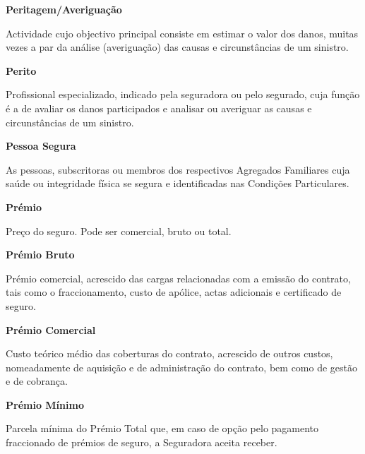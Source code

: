 \begin{description}
\item \textbf{Peritagem/Averiguação}

Actividade cujo objectivo principal consiste em estimar o valor dos danos, muitas vezes a par da análise (averiguação) das causas e circunstâncias de um sinistro.
\end{description}

\begin{description}
\item \textbf{Perito}

Profissional especializado, indicado pela seguradora ou pelo segurado, cuja função é a de avaliar os danos participados e analisar ou averiguar as causas e circunstâncias de um sinistro.
\end{description}

\begin{description}
\item \textbf{Pessoa Segura}

As pessoas, subscritoras ou membros dos respectivos Agregados Familiares cuja saúde ou integridade física se segura e identificadas nas Condições Particulares.
\end{description}

\begin{description}
\item \textbf{Prémio}

Preço do seguro. Pode ser comercial, bruto ou total.
\end{description}

\begin{description}
\item \textbf{Prémio Bruto}

Prémio comercial, acrescido das cargas relacionadas com a emissão do contrato, tais como o fraccionamento, custo de apólice, actas adicionais e certificado de seguro.
\end{description}

\begin{description}
\item \textbf{Prémio Comercial}

Custo teórico médio das coberturas do contrato, acrescido de outros custos, nomeadamente de aquisição e de administração do contrato, bem como de gestão e de cobrança.
\end{description}

\begin{description}
\item \textbf{Prémio Mínimo}

Parcela mínima do Prémio Total que, em caso de opção pelo pagamento fraccionado de prémios de seguro, a Seguradora aceita receber.
\end{description}

